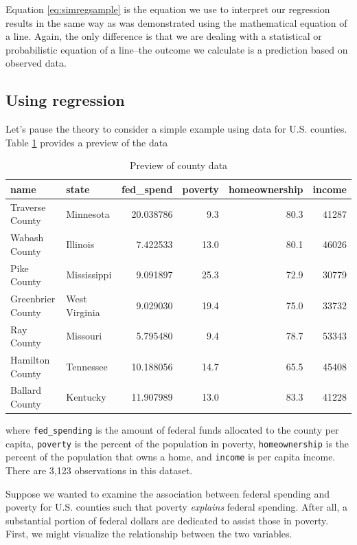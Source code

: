 \documentclass[
]{book}
\begin{document}
Equation \eqref{eq:simregsample} is the equation we use to interpret our regression results in the same way as was demonstrated using the mathematical equation of a line. Again, the only difference is that we are dealing with a statistical or probabilistic equation of a line--the outcome we calculate is a prediction based on observed data.

\hypertarget{using-regression}{%
\subsection{Using regression}\label{using-regression}}

Let's pause the theory to consider a simple example using data for U.S. counties. Table \ref{tab:countydata} provides a preview of the data

\begin{table}

\caption{\label{tab:countydata}Preview of county data}
\centering
\begin{tabular}[t]{l|l|r|r|r|r}
\hline
name & state & fed\_spend & poverty & homeownership & income\\
\hline
Traverse County & Minnesota & 20.038786 & 9.3 & 80.3 & 41287\\
\hline
Wabash County & Illinois & 7.422533 & 13.0 & 80.1 & 46026\\
\hline
Pike County & Mississippi & 9.091897 & 25.3 & 72.9 & 30779\\
\hline
Greenbrier County & West Virginia & 9.029030 & 19.4 & 75.0 & 33732\\
\hline
Ray County & Missouri & 5.795480 & 9.4 & 78.7 & 53343\\
\hline
Hamilton County & Tennessee & 10.188056 & 14.7 & 65.5 & 45408\\
\hline
Ballard County & Kentucky & 11.907989 & 13.0 & 83.3 & 41228\\
\hline
\end{tabular}
\end{table}

where \texttt{fed\_spending} is the amount of federal funds allocated to the county per capita, \texttt{poverty} is the percent of the population in poverty, \texttt{homeownership} is the percent of the population that owns a home, and \texttt{income} is per capita income. There are 3,123 observations in this dataset.

Suppose we wanted to examine the association between federal spending and poverty for U.S. counties such that poverty \emph{explains} federal spending. After all, a substantial portion of federal dollars are dedicated to assist those in poverty. First, we might visualize the relationship between the two variables.
\end{document}
